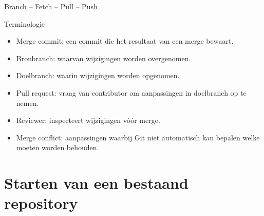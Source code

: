 \documentclass
[kulak,outline] %
{kulakbeamer}
\begin{document}
   \begin{frame}{Branch -- Fetch -- Pull -- Push}
            \begin{exampleblock}{Terminologie}
				\begin{itemize}
					\item Merge commit: een commit die het resultaat van een merge bewaart.
\item Bronbranch: waarvan wijzigingen worden overgenomen.
\item Doelbranch: waarin wijzigingen worden opgenomen.
\item Pull request: vraag van contributor om aanpassingen in doelbranch op te nemen.
\item Reviewer: inspecteert wijzigingen vóór merge.
\item Merge conflict: aanpassingen waarbij Git niet automatisch kan bepalen welke moeten worden
behouden.
				\end{itemize}
			\end{exampleblock}
	\end{frame}

\section{Starten van een bestaand repository}
\end{document}
